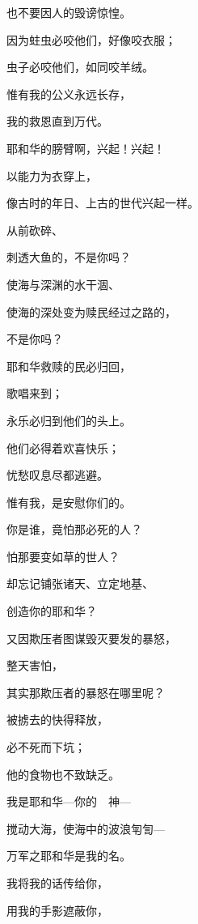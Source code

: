 {\par }{\Q 也不要因人的毁谤惊惶。
\par }{\Q {}因为蛀虫必咬他们，好像咬衣服；
\par }{\Q 虫子必咬他们，如同咬羊绒。
\par }{\Q 惟有我的公义永远长存，
\par }{\Q 我的救恩直到万代。
\par }{\BB \par }{\Q {}耶和华的膀臂啊，兴起！兴起！
\par }{\Q 以能力为衣穿上，
\par }{\Q 像古时的年日、上古的世代兴起一样。
\par }{\Q 从前砍碎{}、
\par }{\Q 刺透大鱼的，不是你吗？
\par }{\Q {}使海与深渊的水干涸、
\par }{\Q 使海的深处变为赎民经过之路的，
\par }{\Q 不是你吗？
\par }{\Q {}耶和华救赎的民必归回，
\par }{\Q 歌唱来到{}；
\par }{\Q 永乐必归到他们的头上。
\par }{\Q 他们必得着欢喜快乐；
\par }{\Q 忧愁叹息尽都逃避。
\par }{\BB \par }{\Q {}惟有我，是安慰你们的。
\par }{\Q 你是谁，竟怕那必死的人？
\par }{\Q 怕那要变如草的世人？
\par }{\Q {}却忘记铺张诸天、立定地基、
\par }{\Q 创造你的耶和华？
\par }{\Q 又因欺压者图谋毁灭要发的暴怒，
\par }{\Q 整天害怕，
\par }{\Q 其实那欺压者的暴怒在哪里呢？
\par }{\Q {}被掳去的快得释放，
\par }{\Q 必不死而下坑；
\par }{\Q 他的食物也不致缺乏。
\par }{\Q {}我是耶和华—你的　神—
\par }{\Q 搅动大海，使海中的波浪匉訇—
\par }{\Q 万军之耶和华是我的名。
\par }{\Q {}我将我的话传给你，
\par }{\Q 用我的手影遮蔽你，
}
